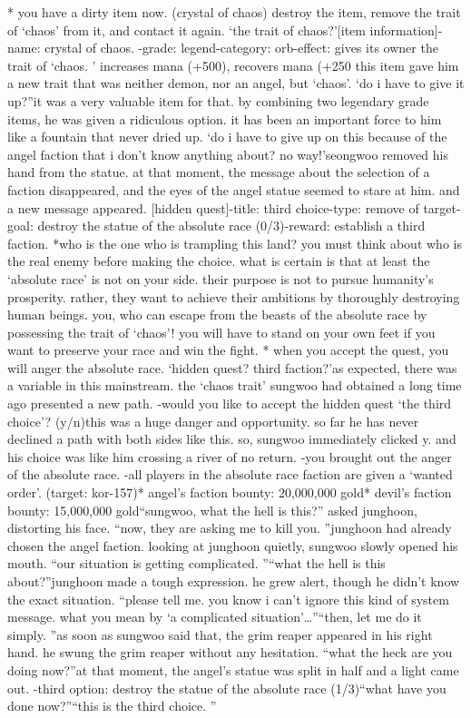 * you have a dirty item now.
 (crystal of chaos) destroy the item, remove the trait of ‘chaos’ from it, and contact it again.
‘the trait of chaos?’[item information]-name: crystal of chaos.
-grade: legend-category: orb-effect: gives its owner the trait of ‘chaos.
’ increases mana (+500), recovers mana (+250%
 this item gave him a new trait that was neither demon, nor an angel, but ‘chaos’.
‘do i have to give it up?”it was a very valuable item for that.
 by combining two legendary grade items, he was given a ridiculous option.
 it has been an important force to him like a fountain that never dried up.
‘do i have to give up on this because of the angel faction that i don’t know anything about? no way!’seongwoo removed his hand from the statue.
 at that moment, the message about the selection of a faction disappeared, and the eyes of the angel statue seemed to stare at him.
and a new message appeared.
[hidden quest]-title: third choice-type: remove of target-goal: destroy the statue of the absolute race (0/3)-reward: establish a third faction.
*who is the one who is trampling this land? you must think about who is the real enemy before making the choice.
what is certain is that at least the ‘absolute race’ is not on your side.
 their purpose is not to pursue humanity’s prosperity.
 rather, they want to achieve their ambitions by thoroughly destroying human beings.
you, who can escape from the beasts of the absolute race by possessing the trait of ‘chaos’! you will have to stand on your own feet if you want to preserve your race and win the fight.
* when you accept the quest, you will anger the absolute race.
‘hidden quest? third faction?’as expected, there was a variable in this mainstream.
 the ‘chaos trait’ sungwoo had obtained a long time ago presented a new path.
-would you like to accept the hidden quest ‘the third choice’? (y/n)this was a huge danger and opportunity.
 so far he has never declined a path with both sides like this.
 so, sungwoo immediately clicked y.
 and his choice was like him crossing a river of no return.
-you brought out the anger of the absolute race.
-all players in the absolute race faction are given a ‘wanted order’.
 (target: kor-157)* angel’s faction bounty: 20,000,000 gold* devil’s faction bounty: 15,000,000 gold“sungwoo, what the hell is this?” asked junghoon, distorting his face.
“now, they are asking me to kill you.
”junghoon had already chosen the angel faction.
looking at junghoon quietly, sungwoo slowly opened his mouth.
“our situation is getting complicated.
”“what the hell is this about?”junghoon made a tough expression.
 he grew alert, though he didn’t know the exact situation.
“please tell me.
 you know i can’t ignore this kind of system message.
 what you mean by ‘a complicated situation’…”“then, let me do it simply.
”as soon as sungwoo said that, the grim reaper appeared in his right hand.
 he swung the grim reaper without any hesitation.
“what the heck are you doing now?”at that moment, the angel’s statue was split in half and a light came out.
-third option: destroy the statue of the absolute race (1/3)“what have you done now?”“this is the third choice.
”

